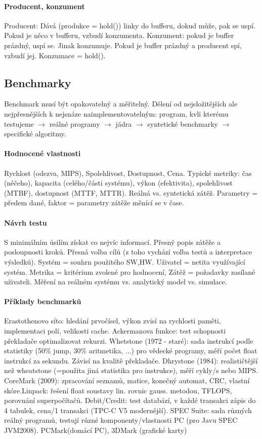 \documentclass[11pt,a4paper]{scrartcl}
\begin{document}
	\paragraph{Producent, konzument} Producent: Dává (produkce = hold()) linky do bufferu, dokud může, pak se uspí. Pokud je něco v bufferu, vzbudí konzumenta. Konzument: pokud je buffer prázdný, uspí se. Jinak konzumuje. Pokud je buffer prázdný a producent spí, vzbudí jej. Konzumace = hold().
	
	\subsection{Benchmarky} Benchmark musí být opakovatelný a měřitelný. Dělení od nejsložitějších ale nejpřesnějších k nejsnáze naimplementovatelným: program, kvli kterému testujeme $\rightarrow$ reálné programy $\rightarrow$ jádra $\rightarrow$ syntetické benchmarky $\rightarrow$ specifické algoritmy.
	
	\paragraph{Hodnocené vlastnosti} Rychlost (odezva, MIPS), Spolehlivost, Dostupnost, Cena. Typické metriky: čas (něčeho), kapacita (celého/části systému), výkon (efektivita), spolehlivost (MTBF), dostupnost (MTTF, MTTR). Reálná vs. syntetická zátěž. Parametry = předem dané, faktor = parametry zátěže měnící se v čase.
	
	\paragraph{Návrh testu} S minimálním úsilím získat co nejvíc informací. Přesný popis zátěže a posloupnosti kroků. Přesná volba cílů (z toho vychází volba testů a interpretace výsledků). Systém = souhrn použitého SW,HW. Uživatel = netita využívající systém. Metrika = kritérium zvolené pro hodnocení, Zátěž = požadavky zasílané uživateli. Měření na reálném systému vs. analytický model vs. simulace. 
	
	\paragraph{Příklady benchmarků} Erastothenovo síto: hledání prvočísel, výkon zvisí na rychlosti paměti, implementaci polí, velikosti cache. Ackermanova funkce: test schopnosti překladače optimalizovat rekurzi. Whetstone (1972 - staré): sada instrukcí podle statistiky (50\% jump, 30\% aritmetika, ...) pro vědecké programy, měří počet float instrukcí za sekundu. Závisí na kvalitě překladače. Dhrystone (1984): realističtější než wheatstone (=použita jiná statistika pro instrukce), měří cykly/s nebo MIPS. CoreMark (2009): zpracování seznamů, matice, konečný automat, CRC, vlastní skóre.Linpack: řešení float soustavy lin. rovnic gauss. metodou, TFLOPS, porovnání superpočítačů. Debit/Credit: test databází, v každé transakci zápis do 4 tabulek, cena/1 transakci (TPC-C V5 modernější). SPEC Suite: sada různých reálný programů, testují různé komponenty/vlastnosti PC (pro Javu SPEC JVM2008). PCMark(domácí PC), 3DMark (grafické karty)
	
\end{document}
